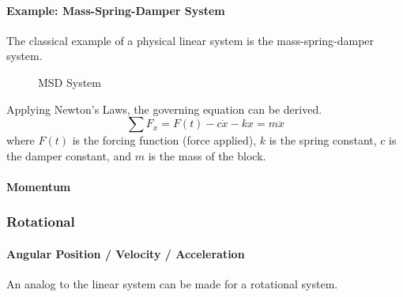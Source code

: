 \documentclass[../notes.tex]{subfiles}
\begin{document}
\paragraph{Example: Mass-Spring-Damper System}
The classical example of a physical linear system is the mass-spring-damper system.
\begin{figure}[H]
    \centering
    \caption{MSD System}
    \label{fig:MSD}
\end{figure}
Applying Newton's Laws, the governing equation can be derived.
\begin{equation}
    \sum F_x = F(t) - c\dot{x} - kx = m\ddot{x}
\end{equation}
where $F(t)$ is the forcing function (force applied), $k$ is the spring constant, $c$ is the damper constant, and $m$ is the mass of the block.

\paragraph{Momentum}
\subsubsection{Rotational}
\paragraph{Angular Position / Velocity / Acceleration}
An analog to the linear system can be made for a rotational system.
\end{document}
